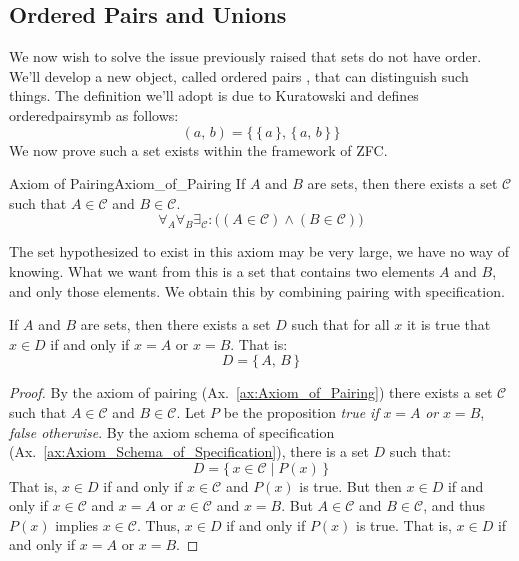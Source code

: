     \subsection{Ordered Pairs and Unions}
        We now wish to solve the issue previously raised that sets do
        not have order. We'll develop a new object, called ordered pairs%
        , that can distinguish such things. The definition
        we'll adopt is due to Kuratowski and
        defines \gls{orderedpairsymb} as follows:
        \begin{equation}
            (a,\,b)=\big\{\,\{\,a\,\},\,\{\,a,\,b\,\}\,\big\}
        \end{equation}
        We now prove such a set exists within the framework of \gls{ZFC}.
        \begin{faxiom}{Axiom of Pairing}{Axiom_of_Pairing}
            If $A$ and $B$ are sets, then there exists a set $\mathcal{C}$
            such that $A\in\mathcal{C}$ and $B\in\mathcal{C}$.
            \begin{equation*}
                \forall_{A}\forall_{B}\exists_{\mathcal{C}}:
                \Big((A\in\mathcal{C})\land(B\in\mathcal{C})\Big)
            \end{equation*}
        \end{faxiom}
        The set hypothesized to exist in this axiom may be very large, we have
        no way of knowing. What we want from this is a set that contains two
        elements $A$ and $B$, and only those elements. We obtain this by
        combining pairing with specification.
        \begin{theorem}
            \label{thm:Existence_of_Set_Built_from_Two_Sets}%
            If $A$ and $B$ are sets, then there exists a set $D$ such that
            for all $x$ it is true that $x\in{D}$ if and only if $x=A$ or
            $x=B$. That is:
            \begin{equation}
                D=\{\,A,\,B\,\}
            \end{equation}
        \end{theorem}
        \begin{proof}
            By the axiom of pairing (Ax.~\ref{ax:Axiom_of_Pairing}) there
            exists a set $\mathcal{C}$ such that $A\in\mathcal{C}$ and
            $B\in\mathcal{C}$. Let $P$ be the proposition
            \textit{true if} $x=A$ \textit{or} $x=B$, \textit{false otherwise}.
            By the axiom schema of specification
            (Ax.~\ref{ax:Axiom_Schema_of_Specification}), there is a set
            $D$ such that:
            \begin{equation}
                D=\{\,x\in\mathcal{C}\;|\;P(x)\,\}
            \end{equation}
            That is, $x\in{D}$ if and only if $x\in\mathcal{C}$ and $P(x)$ is
            true. But then $x\in{D}$ if and only if $x\in\mathcal{C}$ and $x=A$
            or $x\in\mathcal{C}$ and $x=B$. But $A\in\mathcal{C}$ and
            $B\in\mathcal{C}$, and thus $P(x)$ implies $x\in\mathcal{C}$. Thus,
            $x\in{D}$ if and only if $P(x)$ is true. That is, $x\in{D}$ if and
            only if $x=A$ or $x=B$.
        \end{proof}
